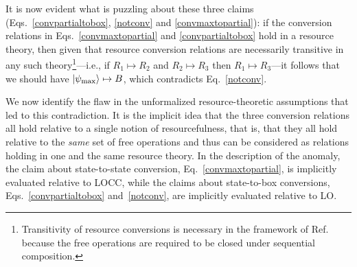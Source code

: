 \documentclass[12pt]{article}
\newcommand{\ket}[1]{\left| #1 \right>}
\theoremstyle{plain}
\theoremstyle{definition}
\begin{document}
It is now evident what is puzzling about these three claims (Eqs.~\eqref{convpartialtobox}, \eqref{notconv} and \eqref{convmaxtopartial}): if the conversion relations in Eqs.~\eqref{convmaxtopartial} and \eqref{convpartialtobox} hold in a resource theory, then given that resource conversion relations are necessarily transitive in any such theory\footnote{Transitivity of resource conversions is necessary in the framework of Ref.~\cite{coecke2016mathematical} because the free operations are required to be closed under sequential composition.}---i.e., if $R_1 \mapsto R_2$ and $R_2 \mapsto R_3$ then $R_1 \mapsto R_3$---it follows that we should have $\ket{\psi_{\rm max}} \mapsto B$, which contradicts Eq.~\eqref{notconv}. 

We now identify the flaw in the unformalized resource-theoretic assumptions
 that led to this contradiction. 
   It is
the implicit idea that the three conversion relations all hold relative to a single notion of resourcefulness, that is, that they all hold relative to the {\em same} set of free operations and thus can be considered as relations holding in one and the same resource theory.
In the description of the anomaly,  the claim about state-to-state conversion,
 Eq.~\eqref{convmaxtopartial}, is implicitly evaluated relative to LOCC, while the claims about state-to-box conversions, Eqs.~\eqref{convpartialtobox} and~\eqref{notconv},
   are implicitly evaluated relative to LO. 
\end{document}
